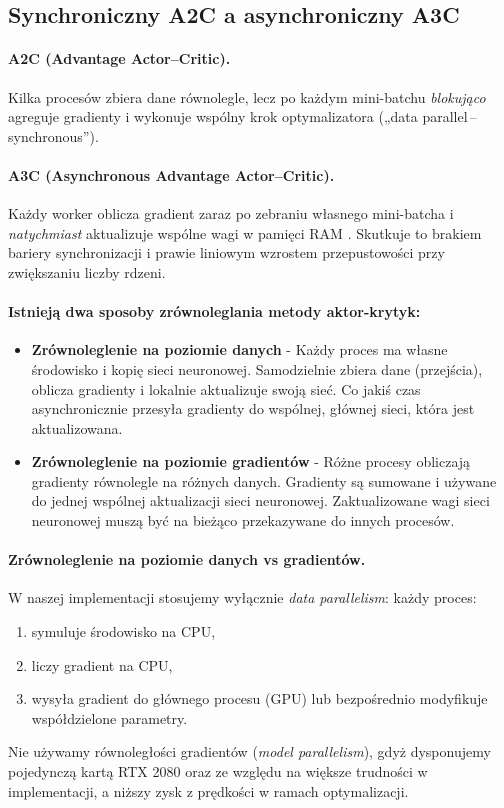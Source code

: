 \documentclass[12pt,a4paper]{article}
\begin{document}
\subsection{Synchroniczny A2C a asynchroniczny A3C}

\paragraph{A2C (Advantage Actor–Critic).}
Kilka procesów zbiera dane równolegle, lecz po każdym
mini-batchu \emph{blokująco} agreguje gradienty i wykonuje
wspólny krok optymalizatora („data parallel\,–\,synchronous”).

\paragraph{A3C (Asynchronous Advantage Actor–Critic).}
Każdy worker oblicza gradient
zaraz po zebraniu własnego mini-batcha
i \emph{natychmiast} aktualizuje wspólne wagi w pamięci RAM
\cite{Mnih2016A3C}.
Skutkuje to brakiem bariery synchronizacji i prawie liniowym wzrostem
przepustowości przy zwiększaniu liczby rdzeni.

\paragraph{Istnieją dwa sposoby zrównoleglania metody aktor-krytyk:} \cite{Lapan2018}
\begin{itemize}
  \item \textbf{Zrównoleglenie na poziomie danych} - Każdy proces ma własne środowisko i kopię sieci neuronowej. Samodzielnie zbiera dane (przejścia), oblicza gradienty i lokalnie aktualizuje swoją sieć. Co jakiś czas asynchronicznie przesyła gradienty do wspólnej, głównej sieci, która jest aktualizowana.
  \item \textbf{Zrównoleglenie na poziomie gradientów} - Różne procesy obliczają gradienty równolegle na różnych danych. Gradienty są sumowane i używane do jednej wspólnej aktualizacji sieci neuronowej. Zaktualizowane wagi sieci neuronowej muszą być na bieżąco przekazywane do innych procesów.
\end{itemize}

\paragraph{Zrównoleglenie na poziomie danych vs gradientów.}
W naszej implementacji stosujemy wyłącznie
\emph{data parallelism}: każdy proces:
\begin{enumerate}
  \item symuluje środowisko na CPU,
  \item liczy gradient na CPU,
  \item wysyła gradient do głównego procesu (GPU) lub
        bezpośrednio modyfikuje współdzielone parametry.
\end{enumerate}
Nie używamy równoległości gradientów
(\emph{model parallelism}),
gdyż dysponujemy pojedynczą kartą RTX 2080 oraz ze względu na większe trudności w implementacji, a niższy zysk z prędkości w ramach optymalizacji.
\end{document}

